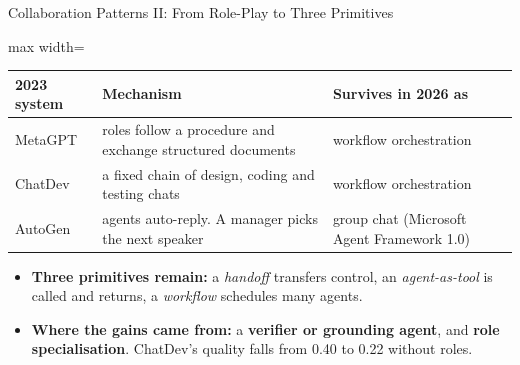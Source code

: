 \begin{frame}{Collaboration Patterns II: From Role-Play to Three Primitives}
    \begin{center}
    \small
    \renewcommand{\arraystretch}{1.2}
    \begin{adjustbox}{max width=\linewidth}\begin{tabular}{>{\raggedright\arraybackslash}p{2.1cm}>{\raggedright\arraybackslash}p{6.2cm}>{\raggedright\arraybackslash}p{4.8cm}}
        \toprule
        \textbf{2023 system} & \textbf{Mechanism} & \textbf{Survives in 2026 as} \\
        \midrule
        MetaGPT & roles follow a procedure and exchange structured documents & workflow orchestration \\
        ChatDev & a fixed chain of design, coding and testing chats & workflow orchestration \\
        AutoGen & agents auto-reply. A manager picks the next speaker & group chat (Microsoft Agent Framework 1.0) \\
        \bottomrule
    \end{tabular}\end{adjustbox}
    \end{center}
    \begin{itemize}\itemsep0.4em
        \item \textbf{Three primitives remain:} a \emph{handoff} transfers control, an \emph{agent-as-tool} is called and returns, a \emph{workflow} schedules many agents.
        \item \textbf{Where the gains came from:} a \textbf{verifier or grounding agent}, and \textbf{role specialisation}. ChatDev's quality falls from 0.40 to 0.22 without roles.
    \end{itemize}
\end{frame}

